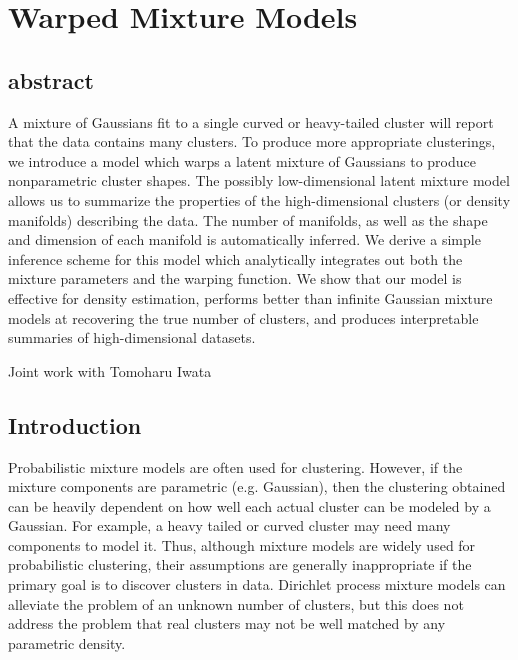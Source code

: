 
\inbpdocument

\chapter{Warped Mixture Models}  %
\label{ch:warped}

\section{abstract}
A mixture of Gaussians fit to a single curved or heavy-tailed cluster will report that the data contains many clusters.  
To produce more appropriate clusterings, we introduce a model which warps a latent mixture of Gaussians to produce nonparametric cluster shapes.  
The possibly low-dimensional latent mixture model allows us to summarize the properties of the high-dimensional clusters (or density manifolds) describing the data.  
The number of manifolds, as well as the shape and dimension of each manifold is automatically inferred.
We derive a simple inference scheme for this model which analytically integrates out both the mixture parameters and the warping function.  
We show that our model is effective for density estimation, performs better than infinite Gaussian mixture models at recovering the true number of clusters, and produces interpretable summaries of high-dimensional datasets.

Joint work with Tomoharu Iwata 


\section{Introduction}
Probabilistic mixture models are often used for clustering.
However, if the mixture components are parametric (e.g. Gaussian), then the clustering obtained can be heavily dependent on how well each actual cluster can be modeled by a Gaussian.
For example, a heavy tailed or curved cluster may need many components to model it.
Thus, although mixture models are widely used for probabilistic clustering, their assumptions are generally inappropriate if the primary goal is to discover clusters in data.
Dirichlet process mixture models can alleviate the problem of an unknown number of clusters, but this does not address the problem that real clusters may not be well matched by any parametric density.

